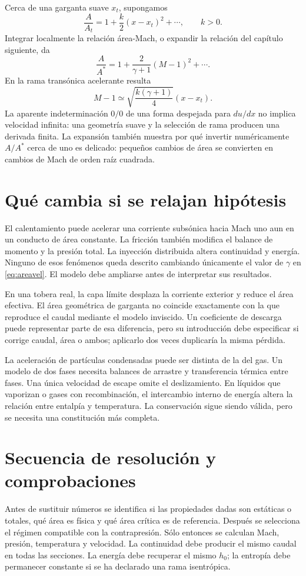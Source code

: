 Cerca de una garganta suave $x_t$, supongamos
\[
 \frac{A}{A_t}=1+\frac{k}{2}(x-x_t)^2+\cdots,\qquad k>0.
\]
Integrar localmente la relación área-Mach, o expandir la relación del capítulo siguiente, da
\[
 \frac{A}{A^*}=1+\frac{2}{\gamma+1}(M-1)^2+\cdots.
\]
En la rama transónica acelerante resulta
\[
 M-1\simeq\sqrt{\frac{k(\gamma+1)}{4}}(x-x_t).
\]
La aparente indeterminación $0/0$ de una forma despejada para $du/dx$ no implica velocidad infinita: una geometría suave y la selección de rama producen una derivada finita. La expansión también muestra por qué invertir numéricamente $A/A^*$ cerca de uno es delicado: pequeños cambios de área se convierten en cambios de Mach de orden raíz cuadrada.
\section{Qué cambia si se relajan hipótesis}
El calentamiento puede acelerar una corriente subsónica hacia Mach uno aun en un conducto de área constante. La fricción también modifica el balance de momento y la presión total. La inyección distribuida altera continuidad y energía. Ninguno de esos fenómenos queda descrito cambiando únicamente el valor de $\gamma$ en \eqref{eq:areavel}. El modelo debe ampliarse antes de interpretar sus resultados.

En una tobera real, la capa límite desplaza la corriente exterior y reduce el área efectiva. El área geométrica de garganta no coincide exactamente con la que reproduce el caudal mediante el modelo inviscido. Un coeficiente de descarga puede representar parte de esa diferencia, pero su introducción debe especificar si corrige caudal, área o ambos; aplicarlo dos veces duplicaría la misma pérdida.

La aceleración de partículas condensadas puede ser distinta de la del gas. Un modelo de dos fases necesita balances de arrastre y transferencia térmica entre fases. Una única velocidad de escape omite el deslizamiento. En líquidos que vaporizan o gases con recombinación, el intercambio interno de energía altera la relación entre entalpía y temperatura. La conservación sigue siendo válida, pero se necesita una constitución más completa.
\section{Secuencia de resolución y comprobaciones}
Antes de sustituir números se identifica si las propiedades dadas son estáticas o totales, qué área es física y qué área crítica es de referencia. Después se selecciona el régimen compatible con la contrapresión. Sólo entonces se calculan Mach, presión, temperatura y velocidad. La continuidad debe producir el mismo caudal en todas las secciones. La energía debe recuperar el mismo $h_0$; la entropía debe permanecer constante si se ha declarado una rama isentrópica.

